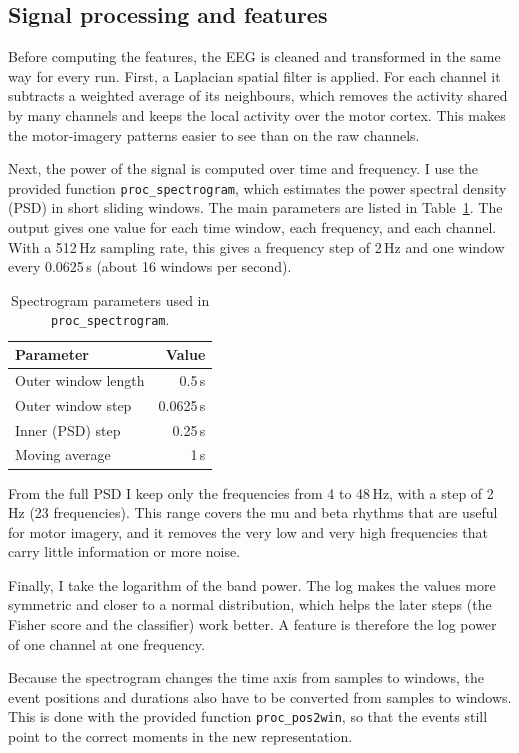 \documentclass[10pt,twocolumn,a4paper]{article}
\begin{document}
\subsection{Signal processing and features}
\label{sec:proc}

Before computing the features, the EEG is cleaned and transformed in the same
way for every run. First, a Laplacian spatial filter is applied. For each
channel it subtracts a weighted average of its neighbours, which removes the
activity shared by many channels and keeps the local activity over the motor
cortex. This makes the motor-imagery patterns easier to see than on the raw
channels.

Next, the power of the signal is computed over time and frequency. I use the
provided function \texttt{proc\_spectrogram}, which estimates the power spectral
density (PSD) in short sliding windows. The main parameters are listed in Table~\ref{tab:spec}. The output gives one
value for each time window, each
frequency, and each channel. With a 512\,Hz sampling rate, this gives a
frequency step of 2\,Hz and one window every 0.0625\,s (about 16 windows per
second).

\begin{table}[h]
\centering
\caption{Spectrogram parameters used in \texttt{proc\_spectrogram}.}
\label{tab:spec}
\small
\begin{tabular}{@{}lr@{}}
\toprule
Parameter & Value \\
\midrule
Outer window length & 0.5\,s \\
Outer window step   & 0.0625\,s \\
Inner (PSD) step    & 0.25\,s \\
Moving average      & 1\,s \\
\bottomrule
\end{tabular}
\end{table}

From the full PSD I keep only the frequencies from 4 to 48\,Hz, with a step of
2\,Hz (23 frequencies). This range covers the mu and beta rhythms that are
useful for motor imagery, and it removes the very low and very high frequencies
that carry little information or more noise.

Finally, I take the logarithm of the band power. The log makes the values more
symmetric and closer to a normal distribution, which helps the later steps (the
Fisher score and the classifier) work better. A feature is therefore the log
power of one channel at one frequency.

Because the spectrogram changes the time axis from samples to windows, the event
positions and durations also have to be converted from samples to windows. This
is done with the provided function \texttt{proc\_pos2win}, so that the events
still point to the correct moments in the new representation.
\end{document}
